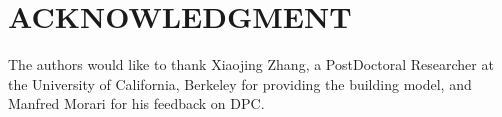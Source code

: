 \section*{ACKNOWLEDGMENT}
The authors would like to thank Xiaojing Zhang, a PostDoctoral Researcher at the University of California, Berkeley for providing the building model, and Manfred Morari for his feedback on DPC.